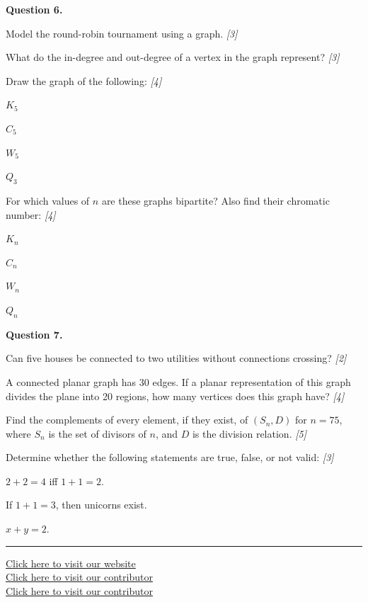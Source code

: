 \documentclass[11pt,a4paper]{article}
\newcommand{\pts}[1]{\hfill\textit{[#1]}}
\begin{document}
\medskip\noindent\textbf{Question 6.}
\begin{parts}
  \item Model the round-robin tournament using a graph. \pts{3}
  \item What do the in-degree and out-degree of a vertex in the graph represent? \pts{3}
  \item Draw the graph of the following: \pts{4}
  \begin{parts}
    \item $K_5$
    \item $C_5$
    \item $W_5$
    \item $Q_3$
  \end{parts}
  \item For which values of $n$ are these graphs bipartite? Also find their chromatic number: \pts{4}
  \begin{parts}
    \item $K_n$
    \item $C_n$
    \item $W_n$
    \item $Q_n$
  \end{parts}
\end{parts}

\medskip\noindent\textbf{Question 7.}
\begin{parts}
  \item Can five houses be connected to two utilities without connections crossing? \pts{2}
  \item A connected planar graph has 30 edges. If a planar representation of this graph divides the plane into 20 regions, how many vertices does this graph have? \pts{4}
  \item Find the complements of every element, if they exist, of $(S_n, D)$ for $n = 75$, where $S_n$ is the set of divisors of $n$, and $D$ is the division relation. \pts{5}
  \item Determine whether the following statements are true, false, or not valid: \pts{3}
  \begin{parts}
    \item $2+2=4$ iff $1+1=2$.
    \item If $1+1=3$, then unicorns exist.
    \item $x + y = 2$.
  \end{parts}
\end{parts}

\vfill
\rule{\linewidth}{0.4pt}
\begin{center}\small
\href{https://bhu-exam.vercel.app/}{Click here to visit our website}\\[4pt]\href{https://me-aryan.vercel.app/}{Click here to visit our contributor}\\[4pt]\href{https://quashan-me.vercel.app/}{Click here to visit our contributor}
\end{center}
\end{document}
